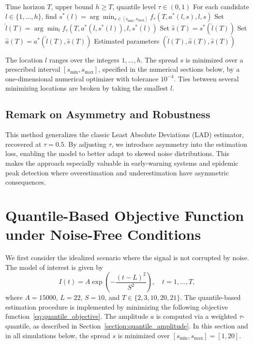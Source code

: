 \documentclass[12pt,a4paper]{article}
\begin{document}
\begin{algorithm}[htbp]
\caption{Quantile-based estimation of peak parameters}
\label{algo:quantile}
\begin{algorithmic}[1]
\REQUIRE Time horizon \( T \), upper bound \( h \ge T \), quantile level \( \tau \in (0,1) \)
\STATE For each candidate \( l \in \{1,\dots,h\} \), find
\( s^*(l) = \arg\min_{s\in[s_{\min},s_{\max}]} f_\tau(T, a^*(l,s), l, s) \)
\STATE Set \( \hat{l}(T) = \arg\min_l f_\tau(T, a^*(l,s^*(l)), l, s^*(l)) \)
\STATE Set \( \hat{s}(T) = s^*(\hat{l}(T)) \)
\STATE Set \( \hat{a}(T) = a^*(\hat{l}(T), \hat{s}(T)) \)
\ENSURE Estimated parameters \( (\hat{l}(T), \hat{a}(T), \hat{s}(T)) \)
\end{algorithmic}
\end{algorithm}
The location $l$ ranges over the integers $1,\dots,h$. The spread $s$ is
minimized over a prescribed interval $[s_{\min},s_{\max}]$, specified in the
numerical sections below, by a one-dimensional numerical optimizer with
tolerance $10^{-4}$. Ties between several minimizing locations are broken by
taking the smallest $l$.

\subsection{Remark on Asymmetry and Robustness}

This method generalizes the classic Least Absolute Deviations (LAD) estimator, recovered at \( \tau = 0.5 \). By adjusting \( \tau \), we introduce asymmetry into the estimation loss, enabling the model to better adapt to skewed noise distributions. This makes the approach especially valuable in early-warning systems and epidemic peak detection where overestimation and underestimation have asymmetric consequences.

\section{Quantile-Based Objective Function under Noise-Free Conditions}
\label{sec:noise-free}

We first consider the idealized scenario where the signal is not corrupted by noise. The model of interest is given by
\[
I(t) = A \exp\left( -\frac{(t - L)^2}{S^2} \right), \quad t = 1, \dots, T,
\]
where \( A = 15000 \), \( L = 22 \), \( S = 10 \), and \( T \in \{2, 3, 10, 20, 21\} \). The quantile-based estimation procedure is implemented by minimizing the following objective function~\eqref{eq:quantile_objective}.
The amplitude \( a \) is computed via a weighted \( \tau \)-quantile, as described in Section~\ref{section:quantile_amplitude}.
In this section and in all simulations below, the spread $s$ is minimized over
$[s_{\min},s_{\max}]=[1,20]$.
\end{document}
